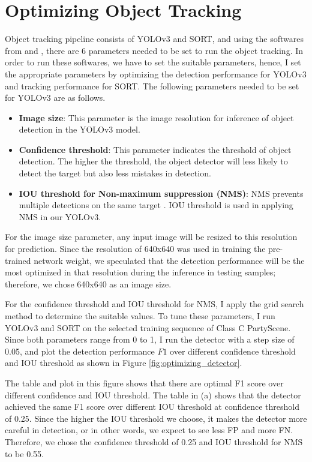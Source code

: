 \section{Optimizing Object Tracking}
\label{sec:methods/section_b}

Object tracking pipeline consists of YOLOv3 and SORT, and using the softwares from \cite{jocher_ultralyticsyolov3_2021} and \cite{abewley_abewleysort_2021}, there are 6 parameters needed to be set to run the object tracking. In order to run these softwares, we have to set the suitable parameters, hence, I set the appropriate parameters by optimizing the detection performance for YOLOv3 and tracking performance for SORT. The following parameters needed to be set for YOLOv3 are as follows.
\begin{itemize}
    \item \textbf{Image size}: This parameter is the image resolution for inference of object detection in the YOLOv3 model.
    \item \textbf{Confidence threshold}: This parameter indicates the threshold of object detection. The higher the threshold, the object detector will less likely to detect the target but also less mistakes in detection.
    \item \textbf{IOU threshold for Non-maximum suppression (NMS)}: NMS prevents multiple detections on the same target \cite{redmon_you_2016}. IOU threshold is used in applying NMS in our YOLOv3.
\end{itemize}
For the image size parameter, any input image will be resized to this resolution for prediction. Since the resolution of 640x640 was used in training the pre-trained network weight, we speculated that the detection performance will be the most optimized in that resolution during the inference in testing samples; therefore, we chose 640x640 as an image size.

For the confidence threshold and IOU threshold for NMS, I apply the grid search method to determine the suitable values. To tune these parameters, I run YOLOv3 and SORT on the selected training sequence of Class C PartyScene. Since both parameters range from 0 to 1, I run the detector with a step size of 0.05, and plot the detection performance $F1$ over different confidence threshold and IOU threshold as shown in Figure \ref{fig:optimizing_detector}.

The table and plot in this figure shows that there are optimal F1 score over different confidence and IOU threshold. The table in (a) shows that the detector achieved the same F1 score over different IOU threshold at confidence threshold of 0.25. Since the higher the IOU threshold we choose, it makes the detector more careful in detection, or in other words, we expect to see less FP and more FN. Therefore, we chose the confidence threshold of 0.25 and IOU threshold for NMS to be 0.55.

